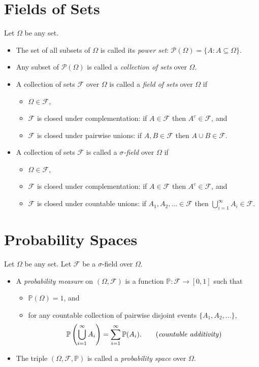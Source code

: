 \documentclass[lecture]{csm}
\newcommand{\prob}{\mathbb{P}}
\def\it{\item}
\def\bit{\begin{itemize}}
\def\eit{\end{itemize}}
\def\ben{\begin{enumerate}}
\def\een{\end{enumerate}}
\begin{document}
\section{Fields of Sets}
Let $\Omega$ be any set.
\bit
\it The set of all subsets of $\Omega$ is called its \emph{power set}: $\mathcal{P}(\Omega) = \{A:A\subseteq\Omega\}$.
\it Any subset of $\mathcal{P}(\Omega)$ is called a \emph{collection of sets} over $\Omega$. 
\it A collection of sets $\mathcal{F}$ over $\Omega$ is called a \emph{field of sets} over $\Omega$ if 
	\bit
	\it $\Omega\in\mathcal{F}$,
	\it $\mathcal{F}$ is closed under complementation: if $A\in\mathcal{F}$ then $A^c\in\mathcal{F}$, and
	\it $\mathcal{F}$ is closed under pairwise unions: if $A,B\in\mathcal{F}$ then $A\cup B\in\mathcal{F}$.
	\eit
\it A collection of sets $\mathcal{F}$ is called a \emph{$\sigma$-field} over $\Omega$ if 
\bit
\it $\Omega\in\mathcal{F}$,
\it $\mathcal{F}$ is closed under complementation: if $A\in\mathcal{F}$ then $A^c\in\mathcal{F}$, and
\it $\mathcal{F}$ is closed under countable unions: if $A_1,A_2,\ldots\in\mathcal{F}$ then $\bigcup_{i=1}^{\infty}A_i \in\mathcal{F}$.
\eit
\eit
\newpage
\section{Probability Spaces}
Let $\Omega$ be any set. Let $\mathcal{F}$ be a $\sigma$-field over $\Omega$. 
\bit
\it A \emph{probability measure} on $(\Omega,\mathcal{F})$ is a function $\prob:\mathcal{F}\to[0,1]$ such that
	\bit
	\it $\prob(\Omega) = 1$, and
	\it for any countable collection of pairwise disjoint events $\{A_1,A_2,\ldots\}$,
	\[
	\prob\left(\bigcup_{i=1}^\infty A_i\right) = \sum_{i=1}^{\infty} \prob(A_i).
	\text{\qquad (\emph{countable additivity})}
	\]
	\eit
\it The triple $(\Omega,\mathcal{F},\prob)$ is called a \emph{probability space} over $\Omega$.
\eit
\end{document}
